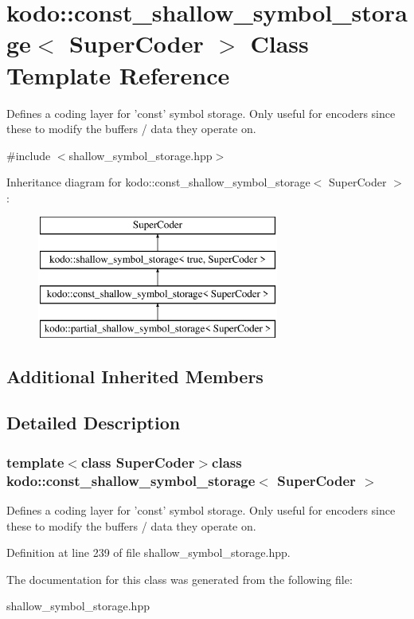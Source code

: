 \hypertarget{classkodo_1_1const__shallow__symbol__storage}{\section{kodo\-:\-:const\-\_\-shallow\-\_\-symbol\-\_\-storage$<$ Super\-Coder $>$ Class Template Reference}
\label{classkodo_1_1const__shallow__symbol__storage}
}


Defines a coding layer for 'const' symbol storage. Only useful for encoders since these to modify the buffers / data they operate on.  




{\ttfamily \#include $<$shallow\-\_\-symbol\-\_\-storage.\-hpp$>$}

Inheritance diagram for kodo\-:\-:const\-\_\-shallow\-\_\-symbol\-\_\-storage$<$ Super\-Coder $>$\-:\begin{figure}[H]
\begin{center}
\leavevmode
\includegraphics[height=4.000000cm]{classkodo_1_1const__shallow__symbol__storage}
\end{center}
\end{figure}
\subsection*{Additional Inherited Members}


\subsection{Detailed Description}
\subsubsection*{template$<$class Super\-Coder$>$class kodo\-::const\-\_\-shallow\-\_\-symbol\-\_\-storage$<$ Super\-Coder $>$}

Defines a coding layer for 'const' symbol storage. Only useful for encoders since these to modify the buffers / data they operate on. 

Definition at line 239 of file shallow\-\_\-symbol\-\_\-storage.\-hpp.



The documentation for this class was generated from the following file\-:\begin{DoxyCompactItemize}
\item 
shallow\-\_\-symbol\-\_\-storage.\-hpp\end{DoxyCompactItemize}
